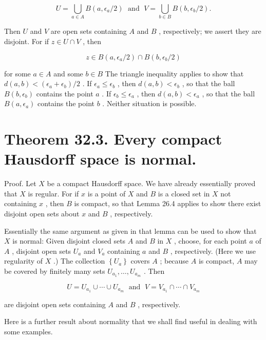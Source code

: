 \[
U = \mathop{\bigcup }\limits_{{a \in  A}}B\left( {a,{\epsilon }_{a}/2}\right) \;\text{ and }\;V = \mathop{\bigcup }\limits_{{b \in  B}}B\left( {b,{\epsilon }_{b}/2}\right) .
\]

Then \(U\) and \(V\) are open sets containing \(A\) and \(B\) , respectively; we assert they are disjoint. For if \(z \in  U \cap  V\) , then

\[
z \in  B\left( {a,{\epsilon }_{a}/2}\right)  \cap  B\left( {b,{\epsilon }_{b}/2}\right)
\]

for some \(a \in  A\) and some \(b \in  B\) The triangle inequality applies to show that \(d\left( {a,b}\right)  < \left( {{\epsilon }_{a} + {\epsilon }_{b}}\right) /2\) . If \({\epsilon }_{a} \leq  {\epsilon }_{b}\) , then \(d\left( {a,b}\right)  < {\epsilon }_{b}\) , so that the ball \(B\left( {b,{\epsilon }_{b}}\right)\) contains the point \(a\) . If \({\epsilon }_{b} \leq  {\epsilon }_{a}\) , then \(d\left( {a,b}\right)  < {\epsilon }_{a}\) , so that the ball \(B\left( {a,{\epsilon }_{a}}\right)\) contains the point \(b\) . Neither situation is possible.

\section*{Theorem 32.3. Every compact Hausdorff space is normal.}

Proof. Let \(X\) be a compact Hausdorff space. We have already essentially proved that \(X\) is regular. For if \(x\) is a point of \(X\) and \(B\) is a closed set in \(X\) not containing \(x\) , then \(B\) is compact, so that Lemma 26.4 applies to show there exist disjoint open sets about \(x\) and \(B\) , respectively.

Essentially the same argument as given in that lemma can be used to show that \(X\) is normal: Given disjoint closed sets \(A\) and \(B\) in \(X\) , choose, for each point \(a\) of \(A\) , disjoint open sets \({U}_{a}\) and \({V}_{a}\) containing \(a\) and \(B\) , respectively. (Here we use regularity of \(X\) .) The collection \(\left\{  {U}_{a}\right\}\) covers \(A\) ; because \(A\) is compact, \(A\) may be covered by finitely many sets \({U}_{{a}_{1}},\ldots ,{U}_{{a}_{m}}\) . Then

\[
U = {U}_{{a}_{1}} \cup  \cdots  \cup  {U}_{{a}_{m}}\;\text{ and }\;V = {V}_{{a}_{1}} \cap  \cdots  \cap  {V}_{{a}_{m}}
\]

are disjoint open sets containing \(A\) and \(B\) , respectively.

Here is a further result about normality that we shall find useful in dealing with some examples.

